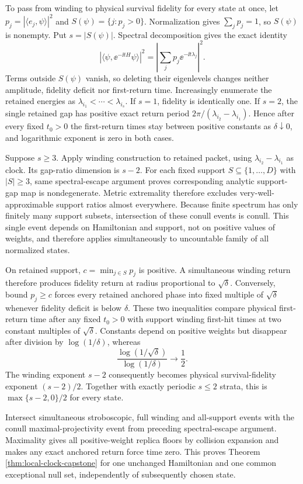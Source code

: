 To pass from winding to physical survival fidelity for every state at once,
let $p_j=|\langle e_j,\psi\rangle|^2$ and
$S(\psi)=\{j:p_j>0\}$.  Normalization gives $\sum_jp_j=1$, so
$S(\psi)$ is nonempty.  Put $s=|S(\psi)|$.  Spectral decomposition gives
the exact identity
\[
 |\langle\psi,\ee^{-\ii tH}\psi\rangle|^2
 =\left|\sum_jp_j\ee^{-\ii t\lambda_j}\right|^2.
\]
Terms outside $S(\psi)$ vanish, so deleting their eigenlevels changes neither
amplitude, fidelity deficit nor first-return time.  Increasingly enumerate
the retained energies as $\lambda_{i_1}<\cdots<\lambda_{i_s}$.  If $s=1$,
fidelity is identically one.  If $s=2$, the single retained gap has positive
exact return period $2\pi/(\lambda_{i_2}-\lambda_{i_1})$.  Hence after every
fixed $t_0>0$ the first-return times stay between positive constants as
$\delta\downarrow0$, and logarithmic exponent is zero in both cases.

Suppose $s\ge3$.  Apply winding construction to retained packet, using
$\lambda_{i_2}-\lambda_{i_1}$ as clock.  Its gap-ratio dimension is $s-2$.
For each fixed support $S\subseteq\{1,\ldots,D\}$ with $|S|\ge3$, same
spectral-escape argument proves corresponding analytic support-gap map is
nondegenerate.  Metric extremality therefore excludes very-well-approximable
support ratios almost everywhere.  Because finite spectrum has only finitely
many support subsets, intersection of these conull events is conull.  This
single event depends on Hamiltonian and support, not on positive values of
weights, and therefore applies simultaneously to uncountable family of all
normalized states.

On retained support, $c=\min_{j\in S}p_j$ is positive.  A simultaneous
winding return therefore produces fidelity return at radius proportional to
$\sqrt\delta$.  Conversely, bound $p_j\ge c$ forces every retained anchored
phase into fixed multiple of $\sqrt\delta$ whenever fidelity deficit is below
$\delta$.  These two inequalities compare physical first-return time after
any fixed $t_0>0$ with support winding first-hit times at two constant
multiples of $\sqrt\delta$.  Constants depend on positive weights but
disappear after division by $\log(1/\delta)$, whereas
\[
 \frac{\log(1/\sqrt\delta)}{\log(1/\delta)}\longrightarrow\frac12.
\]
The winding exponent $s-2$ consequently becomes physical survival-fidelity
exponent $(s-2)/2$.  Together with exactly periodic $s\le2$ strata, this is
$\max\{s-2,0\}/2$ for every state.

Intersect simultaneous stroboscopic, full winding and all-support events with
the conull maximal-projectivity event from preceding spectral-escape argument.
Maximality gives all positive-weight replica floors by collision expansion and
makes any exact anchored return force time zero.  This proves Theorem
\ref{thm:local-clock-capstone} for one unchanged Hamiltonian and one common
exceptional null set, independently of subsequently chosen state.


